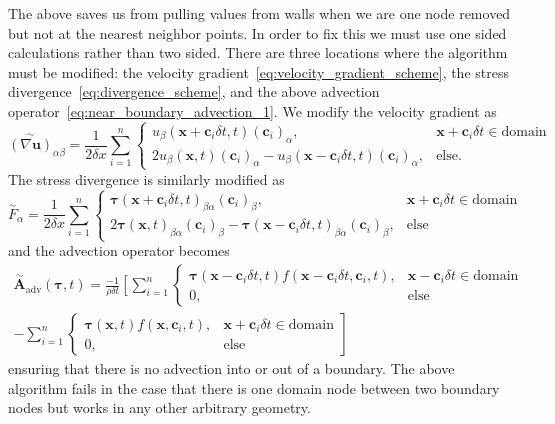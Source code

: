 The above saves us from pulling values from walls when we are one node removed but not at the nearest neighbor points. In order to fix this we must use one sided calculations rather than two sided. There are three locations where the algorithm must be modified: the velocity gradient~\eqref{eq:velocity_gradient_scheme}, the stress divergence~\eqref{eq:divergence_scheme}, and the above advection operator~\eqref{eq:near_boundary_advection_1}.  We modify the velocity gradient as
\begin{equation}\label{eq:near_boundary_velocity_gradient}
\overset{\sim}{(\nabla \bm{u})}_{\alpha \beta} = \frac{1}{2\delta x} \sum_{i=1}^{n}\begin{cases} 
u_\beta(\bm{x} + \bm{c}_i\delta t, t)(\bm{c}_i)_\alpha, &  \bm{x} + \bm{c}_i \delta t \in \mathrm{domain}\\
2u_\beta(\bm{x}, t)(\bm{c}_i)_\alpha - u_\beta(\bm{x} - \bm{c}_i\delta t, t)(\bm{c}_i)_\alpha, & \mathrm{else}.
\end{cases}
\end{equation}
The stress divergence is similarly modified as
\begin{equation}\label{eq:near_boundary_stress_divergence}
\overset{\sim}{F}_\alpha = \frac{1}{2\delta x}\sum_{i=1}^n\begin{cases}
\bm{\tau}(\bm{x}+\bm{c}_i\delta t,t)_{\beta \alpha}(\bm{c}_i)_\beta, & \bm{x} + \bm{c}_i \delta t \in \mathrm{domain} \\
2\bm{\tau}(\bm{x},t)_{\beta \alpha}(\bm{c}_i)_\beta - \bm{\tau}(\bm{x}-\bm{c}_i\delta t,t)_{\beta \alpha}(\bm{c}_i)_\beta, & \mathrm{else}
\end{cases}
\end{equation}
and the advection operator becomes
\begin{multline}\label{eq:near_boundary_advection_2}
\overset{\sim}{\bm{A}}_{\mathrm{adv}}(\bm{\tau},t)=  \frac{-1}{\rho \delta t}\left[\sum_{i=1}^n\right.
\begin{cases}
\bm{\tau}(\bm{x}-\bm{c}_i\delta t,t)f(\bm{x} - \bm{c}_i\delta t, \bm{c}_i,t) , & \bm{x} - \bm{c}_i \delta t \in \mathrm{domain} \\
0, & \mathrm{else} 
\end{cases}\\
-\left.\sum_{i=1}^n\begin{cases}
\bm{\tau}(\bm{x},t)f(\bm{x}, \bm{c}_i,t), & \bm{x} + \bm{c}_i \delta t \in \mathrm{domain} \\
0, & \mathrm{else}\end{cases}\right]
\end{multline}
ensuring that there is no advection into or out of a boundary. The above algorithm fails in the case that there is one domain node between two boundary nodes but works in any other arbitrary geometry. 